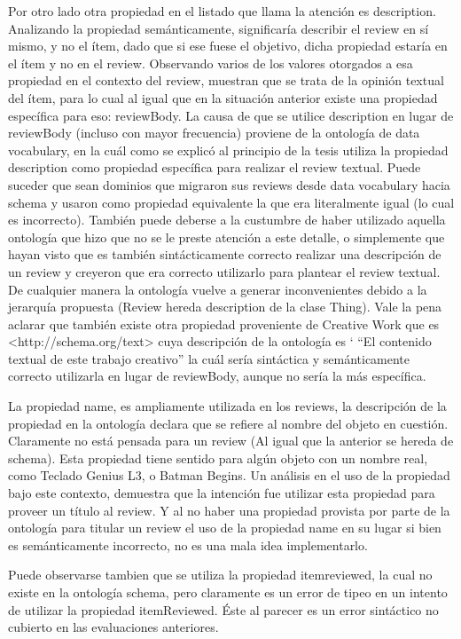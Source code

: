  Por otro lado otra propiedad en el listado que llama la atención es description. Analizando la propiedad semánticamente, significaría describir 
 el review en sí mismo, y no el ítem, dado que si ese fuese el objetivo, dicha propiedad estaría en el ítem y no en el review.
 Observando varios de los valores otorgados a esa propiedad en el contexto del review, muestran que se trata de la opinión textual del ítem, 
 para lo cual al igual que en la situación anterior existe una propiedad específica para eso: reviewBody. 
 La causa de que se utilice description en lugar de reviewBody (incluso con mayor frecuencia) proviene de la ontología de data vocabulary, en la cuál 
 como se explicó al principio de la tesis utiliza la propiedad description como propiedad específica para realizar el review textual.
 Puede suceder que sean dominios que migraron sus reviews desde data vocabulary hacia schema y usaron como propiedad equivalente la que 
 era literalmente igual (lo cual es incorrecto). También puede deberse a la custumbre de haber utilizado aquella ontología que hizo que no se le 
 preste atención a este detalle, o simplemente que hayan visto que es también sintácticamente correcto realizar una descripción de un review 
 y creyeron que era correcto utilizarlo para plantear el review textual.
 De cualquier manera la ontología vuelve a generar inconvenientes debido a la jerarquía propuesta (Review hereda description de la clase Thing).
 Vale la pena aclarar que también existe otra propiedad proveniente de Creative Work que es <http://schema.org/text> cuya descripción de la ontología es `
 ``El contenido textual de este trabajo creativo'' la cuál sería sintáctica y semánticamente correcto utilizarla en lugar de reviewBody, aunque 
 no sería la más específica.
 
 La propiedad name, es ampliamente utilizada en los reviews, la descripción de la propiedad en la ontología declara que se refiere al nombre del objeto en cuestión. 
 Claramente no está pensada para un review (Al igual que la anterior se hereda de schema). Esta propiedad tiene sentido para algún objeto con un nombre real, como Teclado Genius L3, o Batman Begins.
 Un análisis en el uso de la propiedad bajo este contexto, demuestra que la intención fue utilizar esta propiedad para proveer un título al review.
 Y al no haber una propiedad provista por parte de la ontología para titular un review el uso de la propiedad name en su lugar si bien 
 es semánticamente incorrecto, no es una mala idea implementarlo.
 
 Puede observarse tambien que se utiliza la propiedad itemreviewed, la cual no existe en la ontología schema, pero claramente es un 
 error de tipeo en un intento de utilizar la propiedad itemReviewed. Éste al parecer es un error sintáctico no cubierto en las evaluaciones 
 anteriores.
 
